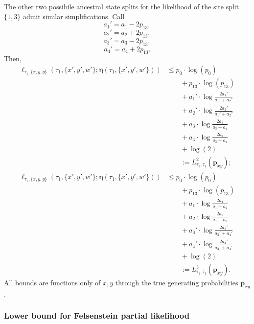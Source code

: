 \documentclass[a4paper]{article}
\newcommand{\fullAncestralSplitPartitions}{\boldsymbol\eta}
\begin{document}
The other two possibile ancestral state splits for the likelihood of the site split $\{1,3\}$ admit similar simplifications.
Call
$$
a_{1}' = a_{1}-2p_{13},
$$
$$
a_{2}' = a_{2}+2p_{13},
$$
$$
a_{3}' = a_{3}-2p_{13},
$$
$$
a_{4}' = a_{4}+2p_{13}.
$$
Then,
\begin{align*}
    \ell_{\tau_1,\{x,y,y\}}(\tau_1, \{x',y',w'\}; \fullAncestralSplitPartitions(\tau_1,\{x',y',w'\}))
    &\le      p_{0}  \cdot\log(p_{0}) \\
    &\qquad + p_{13} \cdot\log(p_{13}) \\
    &\qquad + a_{1}'\cdot\log\frac{2a_{1}'}{a_{1}'+a_{2}'} \\
    &\qquad + a_{2}'\cdot\log\frac{2a_{2}'}{a_{1}'+a_{2}'} \\
    &\qquad + a_{3}\cdot\log\frac{2a_{3}}{a_{3}+a_{4}} \\
    &\qquad + a_{4}\cdot\log\frac{2a_{4}}{a_{3}+a_{4}} \\
    &\qquad + \log(2) \\
    &\qquad := L^{2}_{\tau_1,\tau_1}(\mathbf{p}_{xy});
\end{align*}
\begin{align*}
    \ell_{\tau_1,\{x,y,y\}}(\tau_1, \{x',y',w'\}; \fullAncestralSplitPartitions(\tau_1,\{x',y',w'\}))
    &\le      p_{0}  \cdot\log(p_{0}) \\
    &\qquad + p_{13} \cdot\log(p_{13}) \\
    &\qquad + a_{1}\cdot\log\frac{2a_{1}}{a_{1}+a_{2}} \\
    &\qquad + a_{2}\cdot\log\frac{2a_{2}}{a_{1}+a_{2}} \\
    &\qquad + a_{3}'\cdot\log\frac{2a_{3}'}{a_{3}'+a_{4}'} \\
    &\qquad + a_{4}'\cdot\log\frac{2a_{4}'}{a_{3}'+a_{4}'} \\
    &\qquad + \log(2) \\
    &\qquad := L^{3}_{\tau_1,\tau_1}(\mathbf{p}_{xy}).
\end{align*}
All bounds are functions only of $x,y$ through the true generating probabilities $\mathbf{p}_{xy}$.

\subsubsection{Lower bound for Felsenstein partial likelihood}
\end{document}
